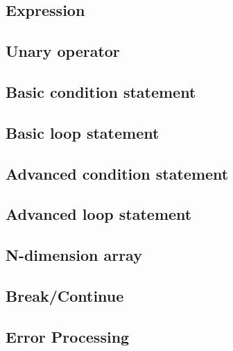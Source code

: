 \documentclass{article}
\begin{document}
		\subsection{Expression}
		\subsection{Unary operator}
		\subsection{Basic condition statement}
		\subsection{Basic loop statement}
		\subsection{Advanced condition statement}
		\subsection{Advanced loop statement}
		\subsection{N-dimension array}
		\subsection{Break/Continue}
		\subsection{Error Processing}
		
		
	
\end{document}
